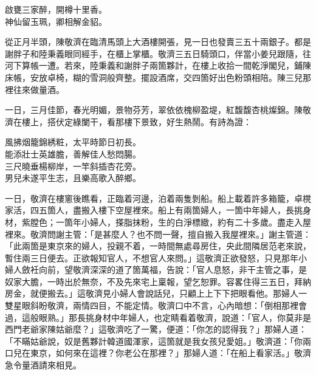 \begin{myquote}
啟甕三家醉，開樽十里香。\\神仙留玉珮，卿相解金貂。
\end{myquote}

從正月半頭，陳敬濟在臨清馬頭上大酒樓開張，見一日也發賣三五十兩銀子。都是謝胖子和陸秉義眼同經手，在櫃上掌櫃。敬濟三五日騎頭口，伴當小姜兒跟隨，往河下算帳一遭。若來，陸秉義和謝胖子兩箇夥計，在樓上收拾一間乾淨閣兒，鋪陳床帳，安放卓椅，糊的雪洞般齊整。擺設酒席，交四箇好出色粉頭相陪。陳三兒那裡往來做量酒。

一日，三月佳節，春光明媚，景物芬芳，翠依依槐柳盈堤，紅馥馥杏桃燦錦。陳敬濟在樓上，搭伏定綠闌干，看那樓下景致，好生熱鬧。有詩為證：

\begin{myquote}
風拂烟籠錦綉粧，太平時節日初長。\\能添壯士英雄膽，善解佳人愁悶腸。\\三尺曉垂楊柳岸，一竿斜插杏花旁。\\男兒未遂平生志，且樂高歌入醉鄉。
\end{myquote}

一日，敬濟在樓窻後瞧看，正臨着河邊，泊着兩隻剝船。船上載着許多箱籠，卓櫈家活，四五箇人，盡搬入樓下空屋裡來。船上有兩箇婦人，{}一箇中年婦人，長挑身材，紫膛色；一箇年小婦人，搽脂抹粉，生的白淨標緻，約有二十多歲。盡走入屋裡來。{}敬濟問謝主管：「是甚麼人？也不問一聲，擅自搬入我屋裡來。」謝主管道：「此兩箇是東京來的婦人，投親不着，一時間無處尋房住，央此間隣居范老來說，暫住兩三日便去。正欲報知官人，不想官人來問。」這敬濟正欲發怒，只見那年小婦人斂衽向前，望敬濟深深的道了箇萬福，告說：「官人息怒，非干主管之事，是奴家大膽，一時出於無奈，不及先來宅上稟報，望乞恕罪。容畧住得三五日，拜納房金，就便搬去。」這敬濟見小婦人會說話兒，只顧上上下下把眼看他。那婦人一雙星眼斜盼敬濟，兩情四目，不能定情。{}敬濟口中不言，心內暗想：「倒相那裡會過，這般眼熟。」那長挑身材中年婦人，也定睛看着敬濟，說道：「官人，你莫非是西門老爺家陳姑爺麼？」這敬濟吃了一驚，便道：「你怎的認得我？」那婦人道：「不瞞姑爺說，奴是舊夥計韓道國渾家，這箇就是我女孩兒愛姐。」敬濟道：「你兩口兒在東京，如何來在這裡？你老公在那裡？」{}那婦人道：「在船上看家活。」敬濟急令量酒請來相見。

